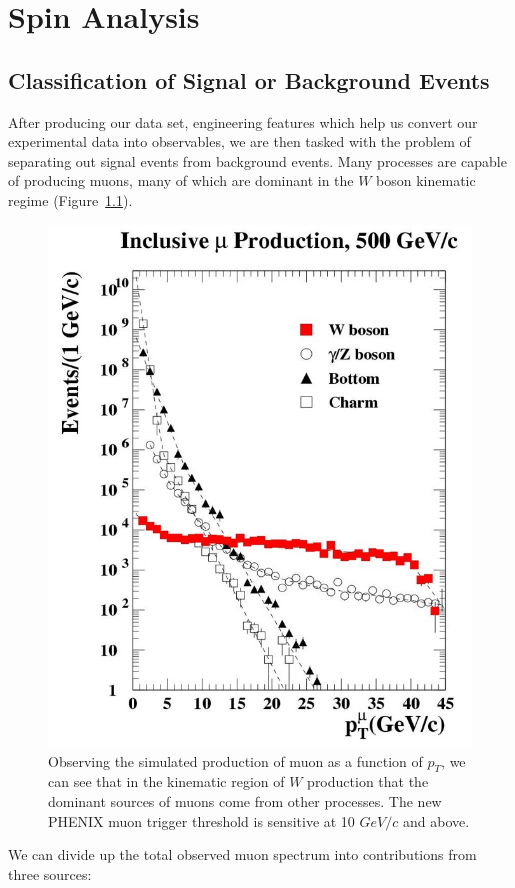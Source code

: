 \chapter{Spin Analysis}
\section{Classification of Signal or Background Events}
After producing our data set, engineering features which help us convert our
experimental data into observables, we are then tasked with the problem of
separating out signal events from background events. Many processes are capable
of producing muons, many of which are dominant in the $W$ boson kinematic
regime (Figure~\ref{fig:muon_production_vs_pt}).

\begin{figure}[H]
	\begin{center}
		\includegraphics[width=0.5\linewidth]{./figures/muon_production_vs_pt.jpg}
		\caption{ Observing the simulated production of muon as a function of $p_T$, we
			can see that in the kinematic region of $W$ production that the dominant sources
			of muons come from other processes. The new PHENIX muon trigger threshold is
			sensitive at 10 $GeV/c$ and above. }
		\label{fig:muon_production_vs_pt}
	\end{center}
\end{figure}

We can divide up the total observed muon spectrum into contributions from three
sources:

